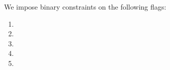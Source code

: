 We impose binary constraints on the following flags:
\begin{multicols}{5}
        \begin{enumerate}
                \item \txSkip{}
		\item \txWarm{}
                \item \txInit{}
                \item \txExec{}
                \item \txFinl{}
        \end{enumerate}
\end{multicols}
